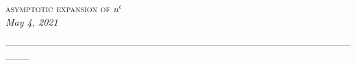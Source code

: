 \documentclass[10pt]{article}
\theoremstyle{plain}
\theoremstyle{remark}
\begin{document}
\begin{center}
{\LARGE \textsc{asymptotic expansion of $u^\epsilon$}}\\

{\textit{May 4, 2021}}
\end{center}



\begin{center}
--------------------------------------------------------------------------------------------------------------------
\end{center}
\end{document}
